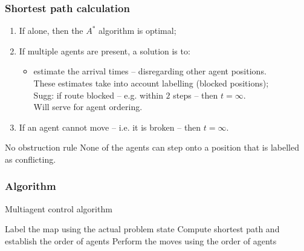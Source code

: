 \documentclass[12pt,aspectratio=169]{beamer}
\begin{document}
\begin{frame}[t]
  \frametitle{Shortest path calculation}

\begin{enumerate}
\item If alone, then the $A^*$ algorithm is optimal;
\vfill
\item If multiple agents are present, a solution is to:
  \begin{itemize}
  \item estimate the arrival times -- disregarding \alert{other agent positions}.\\
  \hfill These estimates take into account labelling (blocked positions);\\
  \hfill Sugg: if route blocked -- e.g. within $2$ steps -- then $t=\infty$.\\
  \hfill Will serve for agent ordering.
  \end{itemize}
\vfill
\item If an agent cannot move -- i.e. it is broken -- then $t=\infty$.
\end{enumerate}

\vfill
\vfill

\begin{block}{No obstruction rule}
  None of the agents can step onto a position that is labelled as conflicting.
\end{block}

\end{frame}

\begin{frame}[fragile,t]
  \frametitle{Algorithm}

\hfill
\begin{minipage}{.8\linewidth}
  \begin{alertblock}{Multiagent control algorithm}
  \begin{algorithmic}[1]
  \Statex
  \State Label the map using the actual problem state
  \Statex {}
  \State Compute shortest path and establish the order of agents
  \Statex
  \State Perform the moves using the order of agents
  \Statex
  \Statex
  \EndWhile
  \end{algorithmic}
  \end{alertblock}
\end{minipage}

\end{frame}
\end{document}
